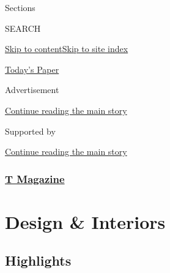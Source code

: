 Sections

SEARCH

\protect\hyperlink{site-content}{Skip to
content}\protect\hyperlink{site-index}{Skip to site index}

\href{https://myaccount.nytimes.com/auth/login?response_type=cookie\&client_id=vi}{}

\href{https://www.nytimes.com/section/todayspaper}{Today's Paper}

Advertisement

\protect\hyperlink{after-top}{Continue reading the main story}

Supported by

\protect\hyperlink{after-sponsor}{Continue reading the main story}

\hypertarget{t-magazine}{%
\subsubsection{\texorpdfstring{\href{/section/t-magazine}{T
Magazine}}{T Magazine}}\label{t-magazine}}

\hypertarget{design--interiors}{%
\section{Design \& Interiors}\label{design--interiors}}

\hypertarget{highlights}{%
\subsection{Highlights}\label{highlights}}

